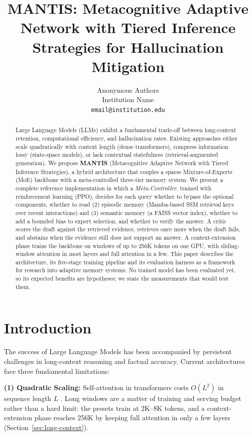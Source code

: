 \documentclass{article}
\title{MANTIS: Metacognitive Adaptive Network with Tiered Inference Strategies for Hallucination Mitigation}
\author{%
  Anonymous Authors \\
  Institution Name \\
  \texttt{email@institution.edu} \\
}
\begin{document}
\maketitle

\begin{abstract}
Large Language Models (LLMs) exhibit a fundamental trade-off between long-context retention, computational efficiency, and hallucination rates. Existing approaches either scale quadratically with context length (dense transformers), compress information lossy (state-space models), or lack contextual statefulness (retrieval-augmented generation). We propose \textbf{MANTIS} (Metacognitive Adaptive Network with Tiered Inference Strategies), a hybrid architecture that couples a sparse Mixture-of-Experts (MoE) backbone with a meta-controlled three-tier memory system. We present a complete reference implementation in which a \textit{Meta-Controller}, trained with reinforcement learning (PPO), decides for each query whether to bypass the optional components, whether to read (2) episodic memory (Mamba-based SSM retrieval keys over recent interactions) and (3) semantic memory (a FAISS vector index), whether to add a bounded bias to expert selection, and whether to verify the answer. A critic scores the draft against the retrieved evidence, retrieves once more when the draft fails, and abstains when the evidence still does not support an answer. A context-extension phase trains the backbone on windows of up to 256K tokens on one GPU, with sliding-window attention in most layers and full attention in a few. This paper describes the architecture, its five-stage training pipeline and its evaluation harness as a framework for research into adaptive memory systems. No trained model has been evaluated yet, so its expected benefits are hypotheses; we state the measurements that would test them.
\end{abstract}

\section{Introduction}

The success of Large Language Models \cite{brown2020gpt3,touvron2023llama,anthropic2024claude} has been accompanied by persistent challenges in long-context reasoning and factual accuracy. Current architectures face three fundamental limitations:

\textbf{(1) Quadratic Scaling:} Self-attention in transformers costs $O(L^2)$ in sequence length $L$ \cite{vaswani2017attention,dao2022flashattention}. Long windows are a matter of training and serving budget rather than a hard limit: the presets train at 2K--8K tokens, and a context-extension phase reaches 256K by keeping full attention in only a few layers (Section~\ref{sec:long-context}).
\end{document}
